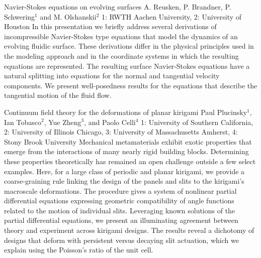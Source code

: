\begin{addmargin}[2em]{0em}
\vspace{1.5ex}
\abs
{Navier-Stokes equations on evolving surfaces}
{A. Reusken, P. Brandner, P. Schwering$^{1}$ and M. Olshanskii$^{2}$}
{1: RWTH Aachen University, 2: University of Houston}
{In this presentation we briefly address several derivations of
incompressible Navier-Stokes type equations that model the dynamics of an
evolving fluidic surface. These derivations differ
in the physical principles used in the modeling approach and in the
coordinate systems in which the resulting equations are represented.
The resulting surface Navier-Stokes equations have a natural splitting
into equations for the normal and tangential velocity  components.
We  present well-posedness results for the equations that describe the
tangential motion of the fluid flow.}


\vspace{1.5ex}
\abs
{Continuum field theory for the deformations of planar kirigami}
{Paul Plucinsky$^1$, Ian Tobasco$^2$, Yue Zheng$^3$, and Paolo Celli$^4$}
{1: University of Southern California, 2: University of Illinois Chicago, 3: University of Massachusetts Amherst, 4: Stony Brook University}
{Mechanical metamaterials exhibit exotic properties that emerge from the interactions of many nearly rigid building blocks.
Determining these properties theoretically has remained an open challenge outside a few select examples.
Here, for a large class of periodic and planar kirigami, we provide a coarse-graining rule linking the design of the panels and slits to the kirigami’s macroscale deformations.
The procedure gives a system of nonlinear partial differential equations expressing geometric compatibility of angle functions related to the motion of individual slits.
Leveraging known solutions of the partial differential equations, we present an illuminating agreement between theory and experiment across kirigami designs.
The results reveal a dichotomy of designs that deform with persistent versus decaying slit actuation, which we explain using the Poisson’s ratio of the unit cell.}



\end{addmargin}
